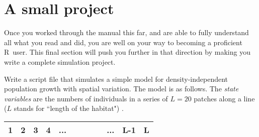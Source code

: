 \documentclass [11pt]{article}
\newcommand\R{{\sf R}}
\numberwithin{exercise}{section}
\begin{document}
\section{A small project}
Once you worked through the manual this far, and are able to fully understand all what you read and did, you are well on your way to becoming a proficient \R\ user. This final section will push you further in that direction by making you write a complete simulation project.

Write a script file that simulates a simple model for density-independent 
population growth with spatial variation. The model is as follows. The \textit{state variables}  
are the numbers of individuals in a series of $L = 20$ 
patches along a line ($L$ stands for ``length of the habitat") . 
\begin{table}[h!]
\begin{tabular}
{|p{22pt}|p{22pt}|p{22pt}|p{22pt}|p{22pt}|p{22pt}|p{22pt}|p{22pt}|p{22pt}|p{22pt}|p{22pt}|p{22pt}|}
\hline
1& 
2& 
3& 
4& 
... & 
& 
& 
& 
& 
...& 
L-1& 
L \\
\hline
\end{tabular}
\end{table}
\end{document}
